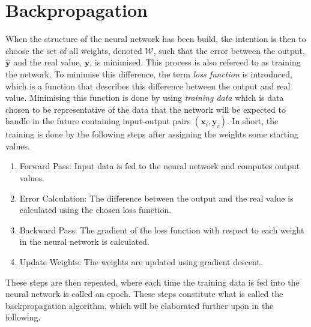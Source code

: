 \section{Backpropagation}
When the structure of the neural network has been build, the intention is then to choose the set of all weights, denoted $\mathcal{W}$, such that the error between the output, $\bm{\hat{y}}$ and the real value, $\bm{y}$, is minimised. This process is also refereed to as training the network. To minimise this difference, the term \emph{loss function} is introduced, which is a function that describes this difference between the output and real value. Minimising this function is done by using \emph{training data} which is data chosen to be representative of the data that the network will be expected to handle in the future containing input-output pairs $(\bm{x}_i,\bm{y}_i)$. In short, the training is done by the following steps after assigning the weights some starting values.
\begin{enumerate}
    \item Forward Pass: Input data is fed to the neural network and computes output values. 
    \item Error Calculation: The difference between the output and the real value is calculated using the chosen loss function.
    \item Backward Pass: The gradient of the loss function with respect to each weight in the neural network is calculated.
    \item Update Weights: The weights are updated using gradient descent.
\end{enumerate}
These steps are then repeated, where each time the training data is fed into the neural network is called an epoch. These steps constitute what is called the backpropagation algorithm, which will be elaborated further upon in the following. 

